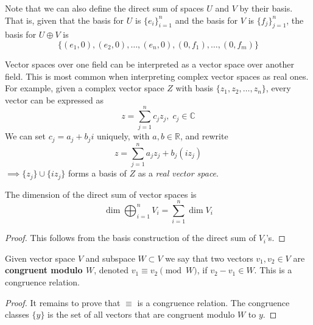   \begin{example}
    Note that we can also define the direct sum of spaces $U$ and $V$ by their basis. That is, given that the basis for $U$ is $\{e_i\}_{i=1}^n$ and the basis for $V$ is $\{f_j\}_{j=1}^n$, the basis for $U \oplus V$ is
    \begin{equation}
      \{(e_1, 0), (e_2, 0), \ldots, (e_n, 0), (0, f_1), \ldots, (0, f_m)\}
    \end{equation}
  \end{example}

  \begin{example}
    Vector spaces over one field can be interpreted as a vector space over another field. This is most common when interpreting complex vector spaces as real ones. For example, given a complex vector space $Z$ with basis $\{z_1, z_2, \ldots, z_n\}$, every vector can be expressed as
    \begin{equation}
      z = \sum_{j=1}^n c_j z_j, \; c_j \in \mathbb{C}
    \end{equation}
    We can set $c_j = a_j + b_j i$ uniquely, with $a, b \in \mathbb{R}$, and rewrite
    \begin{equation}
      z = \sum_{j=1}^n a_j z_j + b_j (i z_j)
    \end{equation}
    $\implies \{ z_j\} \cup \{ i z_j\}$ forms a basis of $Z$ as a \textit{real vector space}. 
  \end{example}

  \begin{theorem}
    The dimension of the direct sum of vector spaces is 
    \begin{equation}
      \dim{\bigoplus_{i=1}^n V_i} = \sum_{i=1}^n \dim{V_i}
    \end{equation}
  \end{theorem}
  \begin{proof}
    This follows from the basis construction of the direct sum of $V_i$'s. 
  \end{proof}

  \begin{definition}
    Given vector space $V$ and subspace $W \subset V$ we say that two vectors $v_1, v_2 \in V$ are \textbf{congruent modulo $W$}, denoted $v_1 \equiv v_2 \pmod{W}$, if $v_2 - v_1 \in W$. This is a congruence relation. 
  \end{definition}
  \begin{proof}
    It remains to prove that $\equiv$ is a congruence relation. The congruence classes $\{ y\}$ is the set of all vectors that are congruent modulo $W$ to $y$. 
  \end{proof}

